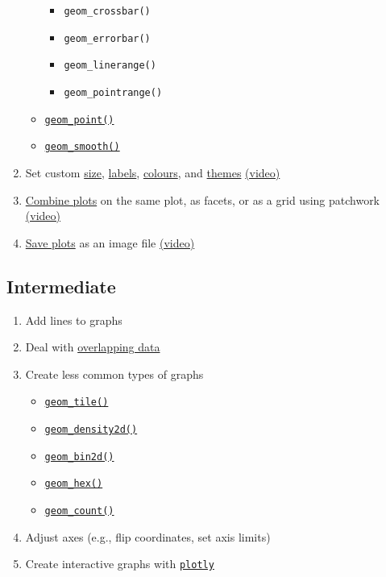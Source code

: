 \documentclass[
  oneside]{book}
\providecommand{\tightlist}{%
  \setlength{\itemsep}{0pt}\setlength{\parskip}{0pt}}
\begin{document}
\begin{enumerate}
\begin{itemize}
    \begin{itemize}
    \tightlist
    \item
      \texttt{geom\_crossbar()}
    \item
      \texttt{geom\_errorbar()}
    \item
      \texttt{geom\_linerange()}
    \item
      \texttt{geom\_pointrange()}
    \end{itemize}
  \item
    \protect\hyperlink{geom_point}{\texttt{geom\_point()}}
  \item
    \protect\hyperlink{geom_smooth}{\texttt{geom\_smooth()}}
  \end{itemize}
\item
  Set custom \protect\hyperlink{custom-size}{size},
  \protect\hyperlink{custom-labels}{labels},
  \protect\hyperlink{custom-colours}{colours}, and
  \protect\hyperlink{themes}{themes} \href{https://youtu.be/6pHuCbOh86s}{(video)}
\item
  \href{combo_plots}{Combine plots} on the same plot, as facets, or as a grid using patchwork \href{https://youtu.be/AnqlfuU-VZk}{(video)}
\item
  \protect\hyperlink{ggsave}{Save plots} as an image file \href{https://youtu.be/f1Y53mjEli0}{(video)}
\end{enumerate}

\hypertarget{intermediate-1}{%
\subsection{Intermediate}\label{intermediate-1}}

\begin{enumerate}
\def\labelenumi{\arabic{enumi}.}
\setcounter{enumi}{5}
\tightlist
\item
  Add lines to graphs
\item
  Deal with \protect\hyperlink{overlap}{overlapping data}
\item
  Create less common types of graphs

  \begin{itemize}
  \tightlist
  \item
    \protect\hyperlink{geom_tile}{\texttt{geom\_tile()}}
  \item
    \protect\hyperlink{geom_density2d}{\texttt{geom\_density2d()}}
  \item
    \protect\hyperlink{geom_bin2d}{\texttt{geom\_bin2d()}}
  \item
    \protect\hyperlink{geom_hex}{\texttt{geom\_hex()}}
  \item
    \protect\hyperlink{geom_count}{\texttt{geom\_count()}}
  \end{itemize}
\item
  Adjust axes (e.g., flip coordinates, set axis limits)
\item
  Create interactive graphs with \protect\hyperlink{plotly}{\texttt{plotly}}
\end{enumerate}
\end{document}
